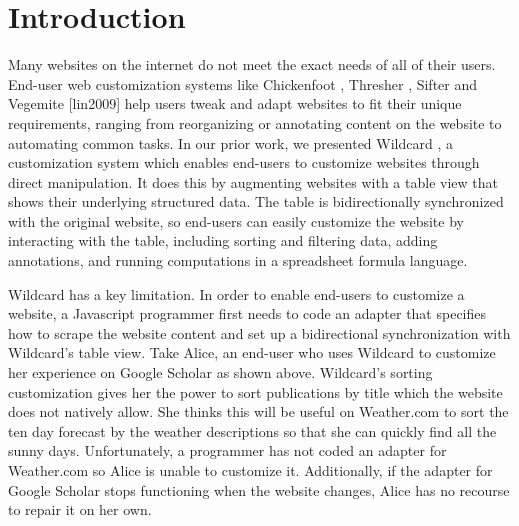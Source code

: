 \documentclass[sigconf,10pt]{acmart}
\begin{document}


\maketitle

\hypertarget{sec:introduction}{%
\section{Introduction}\label{sec:introduction}}

Many websites on the internet do not meet the exact needs of all of
their users. End-user web customization systems like Chickenfoot
\citep{bolin2005}, Thresher \citep{hogue2005}, Sifter \citep{huynh2006}
and Vegemite {[}lin2009{]} help users tweak and adapt websites to fit
their unique requirements, ranging from reorganizing or annotating
content on the website to automating common tasks. In our prior work, we
presented Wildcard \citep{litt2020a}, a customization system which
enables end-users to customize websites through direct manipulation. It
does this by augmenting websites with a table view that shows their
underlying structured data. The table is bidirectionally synchronized
with the original website, so end-users can easily customize the website
by interacting with the table, including sorting and filtering data,
adding annotations, and running computations in a spreadsheet formula
language.

Wildcard has a key limitation. In order to enable end-users to customize
a website, a Javascript programmer first needs to code an adapter that
specifies how to scrape the website content and set up a bidirectional
synchronization with Wildcard's table view. Take Alice, an end-user who
uses Wildcard to customize her experience on Google Scholar as shown
above. Wildcard's sorting customization gives her the power to sort
publications by title which the website does not natively allow. She
thinks this will be useful on Weather.com to sort the ten day forecast
by the weather descriptions so that she can quickly find all the sunny
days. Unfortunately, a programmer has not coded an adapter for
Weather.com so Alice is unable to customize it. Additionally, if the
adapter for Google Scholar stops functioning when the website changes,
Alice has no recourse to repair it on her own.
\end{document}
